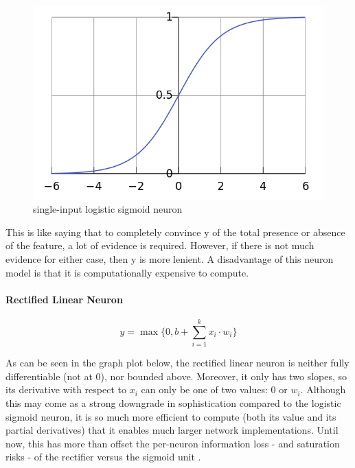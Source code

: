 \documentclass[a4paper,11pt]{article}
\begin{document}
\begin{figure}[h!]
	\centering
	\includegraphics[scale=0.3]{images/sigmoid.png}
	\caption{single-input logistic sigmoid neuron}
\end{figure}

This is like saying that to completely convince y of the total presence or absence of the feature, a lot of evidence is required. However, if there is not much evidence for either case, then y is more lenient. 
A disadvantage of this neuron model is that it is computationally expensive to compute.
                
\paragraph{Rectified Linear Neuron}
\begin{equation}
\label{relu}
y = \max\{0, b + \sum\limits_{i=1}^k x_{i}\cdot w_{i}\}
\end{equation}

As can be seen in the graph plot below, the rectified linear neuron is neither fully differentiable (not at $0$), nor bounded above. Moreover, it only has two slopes, so its derivative with respect to $x_{i}$ can only be one of two values: $0$ or $w_{i}$. Although this may come as a strong downgrade in sophistication compared to the logistic sigmoid neuron, it is so much more efficient to compute (both its value and its partial derivatives) that it enables much larger network implementations\cite{krizhevsky}. Until now, this has more than offset the per-neuron information loss - and saturation risks - of the rectifier versus the sigmoid unit \cite{rectifier}.
\end{document}
